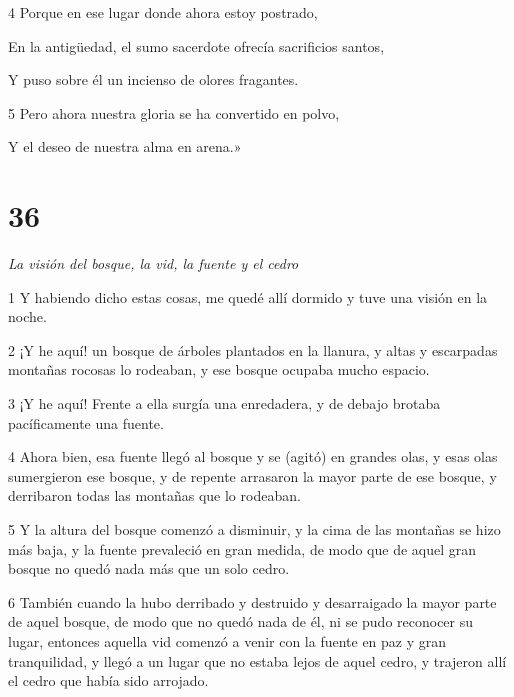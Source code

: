 \par 4 Porque en ese lugar donde ahora estoy postrado,

\par En la antigüedad, el sumo sacerdote ofrecía sacrificios santos,

\par Y puso sobre él un incienso de olores fragantes.

\par 5 Pero ahora nuestra gloria se ha convertido en polvo,

\par Y el deseo de nuestra alma en arena.»

\chapter{36}

\par \textit{La visión del bosque, la vid, la fuente y el cedro}

\par 1 Y habiendo dicho estas cosas, me quedé allí dormido y tuve una visión en la noche.

\par 2 ¡Y he aquí! un bosque de árboles plantados en la llanura, y altas y escarpadas montañas rocosas lo rodeaban, y ese bosque ocupaba mucho espacio.

\par 3 ¡Y he aquí! Frente a ella surgía una enredadera, y de debajo brotaba pacíficamente una fuente.

\par 4 Ahora bien, esa fuente llegó al bosque y se (agitó) en grandes olas, y esas olas sumergieron ese bosque, y de repente arrasaron la mayor parte de ese bosque, y derribaron todas las montañas que lo rodeaban.

\par 5 Y la altura del bosque comenzó a disminuir, y la cima de las montañas se hizo más baja, y la fuente prevaleció en gran medida, de modo que de aquel gran bosque no quedó nada más que un solo cedro.

\par 6 También cuando la hubo derribado y destruido y desarraigado la mayor parte de aquel bosque, de modo que no quedó nada de él, ni se pudo reconocer su lugar, entonces aquella vid comenzó a venir con la fuente en paz y gran tranquilidad, y llegó a un lugar que no estaba lejos de aquel cedro, y trajeron allí el cedro que había sido arrojado.

